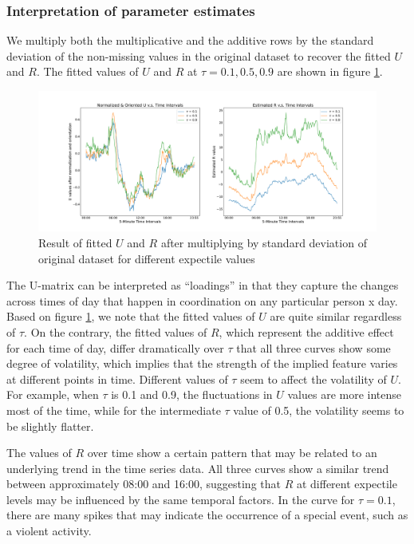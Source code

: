 \documentclass{article}
\begin{document}
\subsubsection{Interpretation of parameter estimates}

We multiply both the multiplicative and the additive rows by the standard deviation of the non-missing values in the original dataset to recover the fitted $U$ and $R$. The fitted values of $U$ and $R$ at $\tau=0.1, 0.5, 0.9$ are shown in figure \ref{U and R}.

\begin{figure}[ht]
\centering
\includegraphics[width=1\textwidth]{U_R.pdf} 
\caption{Result of fitted $U$ and $R$ after multiplying by standard deviation of original dataset for different expectile values} 
\label{U and R} 
\end{figure}

The U-matrix can be interpreted as ``loadings'' in that they capture the changes across times of day that happen in coordination on any particular person x day.  Based on figure \ref{U and R}, we note that the fitted values of $U$ are quite similar regardless of $\tau$.  On the contrary, the fitted values of $R$, which represent the additive effect for each time of day, differ dramatically over $\tau$ that all three curves show some degree of volatility, which implies that the strength of the implied feature varies at different points in time. Different values of $\tau$ seem to affect the volatility of $U$. For example, when $\tau$ is 0.1 and 0.9, the fluctuations in $U$ values are more intense most of the time, while for the intermediate $\tau$ value of 0.5, the volatility seems to be slightly flatter.

The values of $R$ over time show a certain pattern that may be related to an underlying trend in the time series data. All three curves show a similar trend between approximately 08:00 and 16:00, suggesting that $R$ at different expectile levels may be influenced by the same temporal factors. In the curve for $\tau = 0.1$, there are many spikes that may indicate the occurrence of a special event, such as a violent activity.
\end{document}
